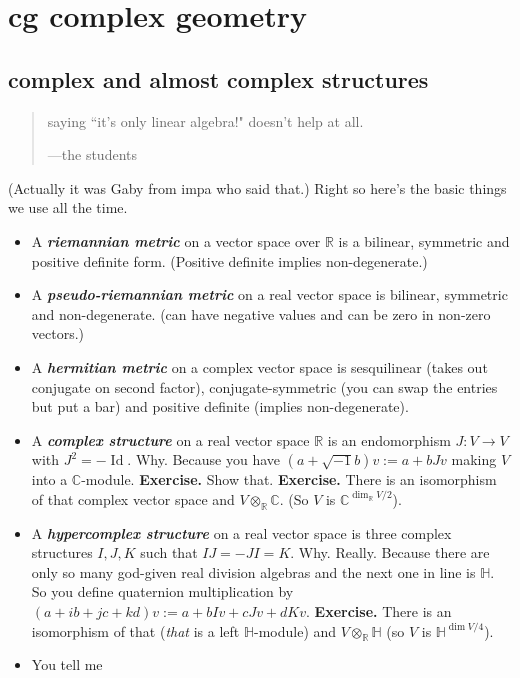 \chapter{cg complex geometry}

\section{complex and almost complex structures}
\vspace{1em}
\begin{quotation}
saying ``it's only linear algebra!" doesn't help at all.

	\hfill ---the students
\end{quotation}
\vspace{2em}

(Actually it was Gaby from impa who said that.) Right so here's the basic things we use all the time.
\begin{itemize}
\item A \textit{\textbf{riemannian metric}} on a vector space over \(\mathbb{R}\) is a bilinear, symmetric and positive definite form. (Positive definite implies non-degenerate.)
\item A \textit{\textbf{pseudo-riemannian metric}} on a real vector space is bilinear, symmetric and non-degenerate. (can have negative values and can be zero in non-zero vectors.)
\item A \textit{\textbf{hermitian metric}} on a complex vector space is sesquilinear (takes out conjugate on second factor), conjugate-symmetric (you can swap the entries but put a bar) and positive definite (implies non-degenerate).
\item A \textit{\textbf{complex structure}} on a real vector space  \(\mathbb{R}\) is an endomorphism \(J:V \to V\) with \(J^2=-\operatorname{Id}\). Why. Because you have \((a+\sqrt{-1}b)v:=a+bJv\) making \(V\) into a \(\mathbb{C}\)-module. \textbf{Exercise.} Show that.  \textbf{Exercise.} There is an isomorphism of that complex vector space and \(V \otimes_{\mathbb{R}}\mathbb{C}\). (So \(V\) is \(\mathbb{C}^{\dim_{\mathbb{R}} V/2}\)).
\item A \textit{\textbf{hypercomplex structure}} on a real vector space is three complex structures \(I,J,K\) such that \(I J =- J I = K\). Why. Really. Because there are only so many god-given real division algebras and the next one in line is \(\mathbb{H}\). So you define quaternion multiplication by \((a+ib+jc+kd)v:=a+b Iv+c Jv + d Kv\). \textbf{Exercise.} There is an isomorphism of that (\textit{that} is a left \(\mathbb{H}\)-module) and \(V \otimes_{\mathbb{R}}\mathbb{H}\) (so \(V\) is \(\mathbb{H}^{\dim V/4}\)).
\item You tell me
\end{itemize}
